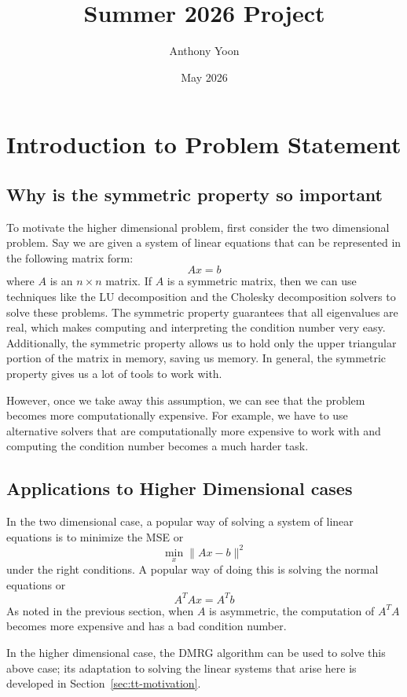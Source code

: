 \documentclass[12pt]{article}
\title{Summer 2026 Project}
\author{Anthony Yoon}
\date{May 2026}
\theoremstyle{definition}
\theoremstyle{remark}
\begin{document}
\maketitle
\tableofcontents
\newpage 
\section{Introduction to Problem Statement}\label{sec:problem}
\subsection{Why is the symmetric property so important}\label{sec:symmetric}
To motivate the higher dimensional problem, first consider the two dimensional problem. 
Say we are given a system of linear equations that can be represented in the following matrix form: 
\[
Ax = b 
\]
where $A$ is an $n \times n$ matrix. If $A$ is a symmetric matrix, then we can use techniques like the LU decomposition and the Cholesky decomposition solvers to solve these problems. The symmetric property guarantees that all eigenvalues are real, which makes computing and interpreting the condition number very easy. Additionally, the symmetric property allows us to hold only the upper triangular portion of the matrix in memory, saving us memory. In general, the symmetric property gives us a lot of tools to work with.

However, once we take away this assumption, we can see that the problem becomes more computationally expensive. For example, we have to use alternative solvers that are computationally more expensive to work with and computing the condition number becomes a much harder task. 
\subsection{Applications to Higher Dimensional cases}\label{sec:higher-dim}
In the two dimensional case, a popular way of solving a system of linear equations is to minimize the MSE or 
\[
\min_x \|Ax -b\|^2
\]
under the right conditions. A popular way of doing this is solving the normal equations or
\[
A^T A x =  A^T b 
\]
As noted in the previous section, when $A$ is asymmetric, the computation of $A^T A$ becomes more expensive and has a bad condition number.

In the higher dimensional case, the DMRG algorithm can be used to solve this above case; its adaptation to solving the linear systems that arise here is developed in Section~\ref{sec:tt-motivation}.
\end{document}
